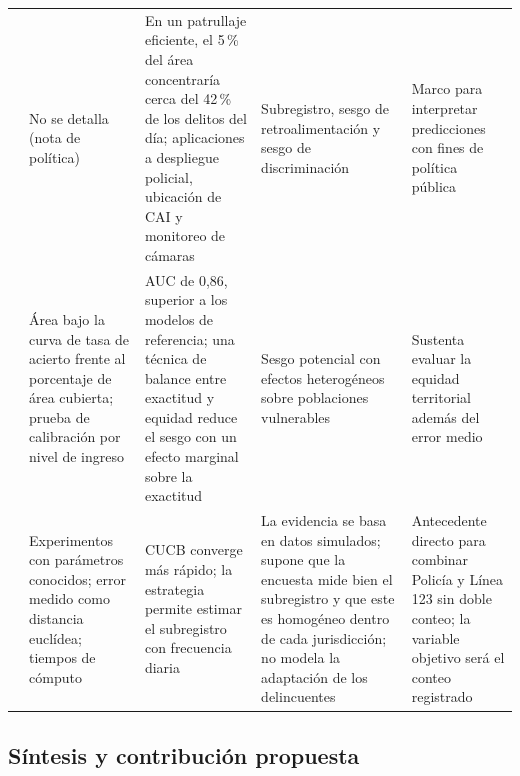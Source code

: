 {\begin{longtable}{@{}>{\raggedright\arraybackslash}p{2.2cm}>{\raggedright\arraybackslash}p{3.1cm}>{\raggedright\arraybackslash}p{3.3cm}>{\raggedright\arraybackslash}p{3.0cm}>{\raggedright\arraybackslash}p{2.9cm}@{}}
\addlinespace
\citet{riascos2020} & No se detalla (nota de política) & En un patrullaje eficiente, el 5\,\% del área concentraría cerca del 42\,\% de los delitos del día; aplicaciones a despliegue policial, ubicación de CAI y monitoreo de cámaras & Subregistro, sesgo de retroalimentación y sesgo de discriminación & Marco para interpretar predicciones con fines de política pública \\
\addlinespace
\citet{urcuqui2020} & Área bajo la curva de tasa de acierto frente al porcentaje de área cubierta; prueba de calibración por nivel de ingreso & AUC de 0,86, superior a los modelos de referencia; una técnica de balance entre exactitud y equidad reduce el sesgo con un efecto marginal sobre la exactitud & Sesgo potencial con efectos heterogéneos sobre poblaciones vulnerables & Sustenta evaluar la equidad territorial además del error medio \\
\addlinespace
\citet{riascos2023} & Experimentos con parámetros conocidos; error medido como distancia euclídea; tiempos de cómputo & CUCB converge más rápido; la estrategia permite estimar el subregistro con frecuencia diaria & La evidencia se basa en datos simulados; supone que la encuesta mide bien el subregistro y que este es homogéneo dentro de cada jurisdicción; no modela la adaptación de los delincuentes & Antecedente directo para combinar Policía y Línea 123 sin doble conteo; la variable objetivo será el conteo registrado \\
\end{longtable}
}

\subsection{Síntesis y contribución propuesta}

